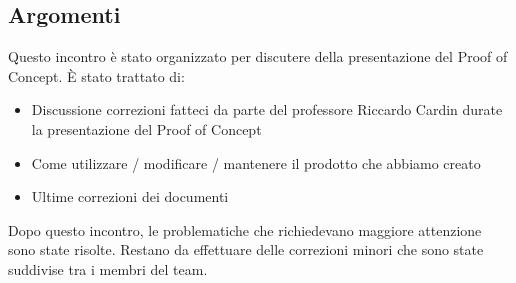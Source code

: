         \subsection{Argomenti}
            Questo incontro è stato organizzato per discutere della presentazione del Proof of Concept. È stato trattato di:
            \begin{itemize}
                \item Discussione correzioni fatteci da parte del professore Riccardo Cardin durate la presentazione del Proof of Concept
                \item Come utilizzare / modificare / mantenere il prodotto che abbiamo creato
                \item Ultime correzioni dei documenti
            \end{itemize}
            Dopo questo incontro, le problematiche che richiedevano maggiore attenzione sono state risolte. Restano da effettuare delle correzioni minori che sono state suddivise tra i membri del team.

